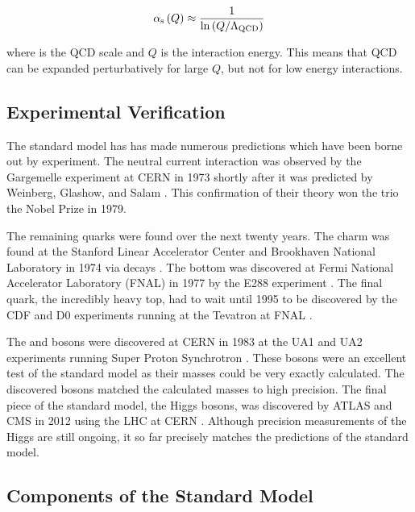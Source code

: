 \begin{equation}\label{eq:alpha_strong}
    \alpha_{\text{s}} \left( Q \right)
    \approx
    \frac{1}{
        {\mathrm{ln}} \left( Q / \Lambda_{\text{QCD}} \right)
    }
\end{equation}

where \LambdaQCD is the QCD scale and $Q$ is the interaction energy. This means
that QCD can be expanded perturbatively for large $Q$, but not for low energy
interactions.

\subsection{Experimental Verification}

The standard model has has made numerous predictions which have been borne out
by experiment. The neutral current interaction was observed by the Gargemelle
experiment at CERN in 1973 shortly after it was predicted by Weinberg, Glashow,
and Salam \cite{hasert1973}. This confirmation of their theory won the trio the
Nobel Prize in 1979.

The remaining quarks were found over the next twenty years. The charm was found
at the Stanford Linear Accelerator Center and Brookhaven National Laboratory in
1974 via \jpsi decays \cite{aubert1974}\cite{augustin1974}. The bottom was
discovered at Fermi National Accelerator Laboratory (FNAL) in 1977 by the E288
experiment \cite{herb1977}. The final quark, the incredibly heavy top, had to
wait until 1995 to be discovered by the CDF and D0 experiments running at the
Tevatron at FNAL \cite{cdf1995}\cite{d01995}.

The \W and \Z bosons were discovered at CERN in 1983 at the UA1 and UA2
experiments running Super Proton Synchrotron
\cite{ua1_w}\cite{ua2_w}\cite{ua1_z}\cite{ua2_z}. These bosons were an
excellent test of the standard model as their masses could be very exactly
calculated. The discovered bosons matched the calculated masses to high
precision. The final piece of the standard model, the Higgs bosons, was
discovered by ATLAS and CMS in 2012 using the LHC at CERN
\cite{atlas_higgs}\cite{cms_higgs}. Although precision measurements of the
Higgs are still ongoing, it so far precisely matches the predictions of the
standard model.

\subsection{Components of the Standard Model}

